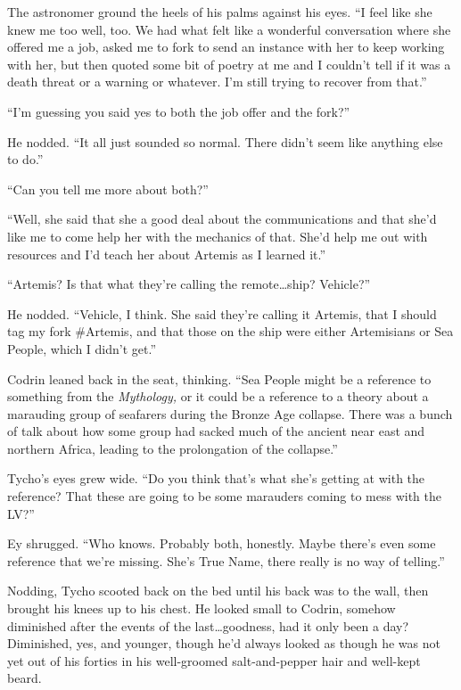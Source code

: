 The astronomer ground the heels of his palms against his eyes. ``I feel like she knew me too well, too. We had what felt like a wonderful conversation where she offered me a job, asked me to fork to send an instance with her to keep working with her, but then quoted some bit of poetry at me and I couldn't tell if it was a death threat or a warning or whatever. I'm still trying to recover from that.''

``I'm guessing you said yes to both the job offer and the fork?''

He nodded. ``It all just sounded so normal. There didn't seem like anything else to do.''

``Can you tell me more about both?''

``Well, she said that she a good deal about the communications and that she'd like me to come help her with the mechanics of that. She'd help me out with resources and I'd teach her about Artemis as I learned it.''

``Artemis? Is that what they're calling the remote\ldots ship? Vehicle?''

He nodded. ``Vehicle, I think. She said they're calling it Artemis, that I should tag my fork \#Artemis, and that those on the ship were either Artemisians or Sea People, which I didn't get.''

Codrin leaned back in the seat, thinking. ``Sea People might be a reference to something from the \emph{Mythology,} or it could be a reference to a theory about a marauding group of seafarers during the Bronze Age collapse. There was a bunch of talk about how some group had sacked much of the ancient near east and northern Africa, leading to the prolongation of the collapse.''

Tycho's eyes grew wide. ``Do you think that's what she's getting at with the reference? That these are going to be some marauders coming to mess with the LV?''

Ey shrugged. ``Who knows. Probably both, honestly. Maybe there's even some reference that we're missing. She's True Name, there really is no way of telling.''

Nodding, Tycho scooted back on the bed until his back was to the wall, then brought his knees up to his chest. He looked small to Codrin, somehow diminished after the events of the last\ldots goodness, had it only been a day? Diminished, yes, and younger, though he'd always looked as though he was not yet out of his forties in his well-groomed salt-and-pepper hair and well-kept beard.

